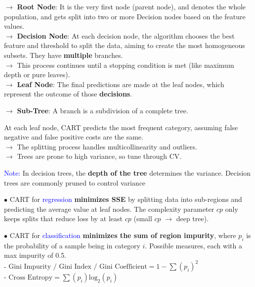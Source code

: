 \documentclass[letterpaper, 10.5pt,landscape]{article}
\begin{document}
\begin{multicols*}{3}
$\rightarrow$ \textbf{Root Node}: It is the very first node (parent node), and denotes the whole population, and gets split into two or more Decision nodes based on the feature values. \\
$\rightarrow$ \textbf{Decision Node}: At each decision node, the algorithm chooses the best feature and threshold to split the data, aiming to create the most homogeneous subsets. They have \textbf{multiple} branches.  \\

$\rightarrow$ This process continues until a stopping condition is met (like maximum depth or pure leaves). \\

$\rightarrow$ \textbf{Leaf Node}: The final predictions are made at the leaf nodes, which represent the outcome of those \textbf{decisions}.

$\rightarrow$ \textbf{Sub-Tree}: A branch is a subdivision of a complete tree. 


\vspace{3pt}
At each leaf node, CART predicts the most frequent category, assuming false negative and false positive costs are the same. \\

$\rightarrow$ The splitting process handles multicollinearity and outliers. \\
$\rightarrow$ Trees are prone to high variance, so tune through CV.

\vspace{2pt}
\textcolor{blue}{Note:} In decision trees, the \textbf{depth of the tree} determines the variance. Decision trees are commonly pruned to control variance


\vspace{3pt} 


$\bullet$ CART for \textcolor{blue}{regression } \textbf{minimizes SSE} by splitting data into sub-regions and predicting the average value at leaf nodes. The complexity parameter $cp$ only keeps splits that reduce loss by at least $cp$ (small $cp$ $\rightarrow$ deep tree). 

\vspace{2pt}
$\bullet$ CART for \textcolor{blue}{classification }
\textbf{minimizes the sum of region impurity}, where $p_{i}$ is the probability of a sample being in category $i$. Possible measures, each with a max impurity of 0.5.
\\

- \( \boxed{\text{Gini Impurity / Gini Index / Gini Coefficient} = 1 - \sum(p_{i})^{2}} \) \\
- \(\boxed{
\text{Cross Entropy} = \sum(p_{i})\text{log}_{2}(p_{i})} \)




\end{multicols*}
\end{document}
